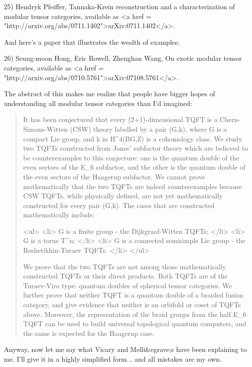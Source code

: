 25) Hendryk Pfeiffer, Tannaka-Krein reconstruction and a 
characterization of modular tensor categories, available as
<a href = "http://arxiv.org/abs/0711.1402">arXiv:0711.1402</a>.

And here's a paper that illustrates the wealth of examples:

26)  Seung-moon Hong, Eric Rowell, Zhenghan Wang, On exotic modular
tensor categories, available as <a href = "http://arxiv.org/abs/0710.5761">arXiv:07108.5761</a>.

The abstract of this makes me realize that people have bigger hopes of
understanding all modular tensor categories than I'd imagined:

\begin{quote}
  It has been conjectured that every (2+1)-dimensional TQFT is a
  Chern-Simons-Witten (CSW) theory labelled by a pair (G,k), where G
  is a compact Lie group, and k in H^{4}(BG,Z) is a cohomology
  class.  We study two TQFTs constructed from Jones' subfactor theory
  which are believed to be counterexamples to this conjecture: one is
  the quantum double of the even sectors of the E_{6}
  subfactor, and the other is the quantum double of the even sectors
  of the Haagerup subfactor. We cannot prove mathematically that the
  two TQFTs are indeed counterexamples because CSW TQFTs, while
  physically defined, are not yet mathematically constructed for every
  pair (G,k).  The cases that are constructed mathematically include:

<ul>
<li>
  G is a finite group - the Dijkgraaf-Witten TQFTs; 
</li>
<li>
  G is a torus T^{n};
</li>
<li>
  G is a connected semisimple Lie group - the Reshetikhin-Turaev TQFTs.
</li>
</ul>

  We prove that the two TQFTs are not among those mathematically
  constructed TQFTs or their direct products.  Both TQFTs are of the
  Turaev-Viro type: quantum doubles of spherical tensor categories.
  We further prove that neither TQFT is a quantum double of a braided
  fusion category, and give evidence that neither is an orbifold or
  coset of TQFTs above. Moreover, the representation of the braid
  groups from the half E_{6} TQFT can be used to build
  universal topological quantum computers, and the same is expected
  for the Haagerup case.
\end{quote}

Anyway, now let me say what Vicary and Melli&egrave;s have been explaining 
to me.  I'll give it in a highly simplified form... and all mistakes
are my own.


